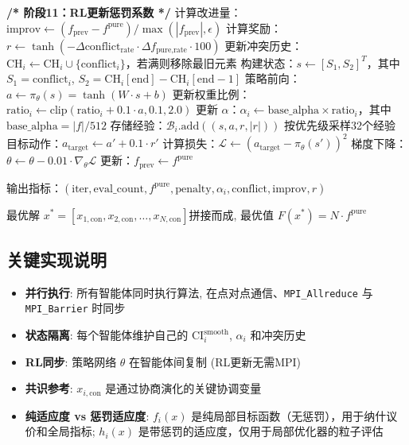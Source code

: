 \documentclass[11pt,a3paper]{ctexart}
\begin{document}
\begin{algorithmic}[1]
    \State \textbf{/* 阶段11：RL更新惩罚系数 */}
    \State 计算改进量：$\text{improv} \gets (f_{\text{prev}} - f^{\text{pure}}) / \max(|f_{\text{prev}}|, \epsilon)$ 
    \State 计算奖励：$r \gets \tanh\!\left(-\Delta\text{conflict}_{\text{rate}} \cdot \Delta f_{\text{pure,rate}} \cdot 100\right)$
    \State 更新冲突历史：$\text{CH}_i \gets \text{CH}_i \cup \{\text{conflict}_i\}$，若满则移除最旧元素
    \State 构建状态：$s \gets [S_1, S_2]^T$，其中 $S_1 = \text{conflict}_i$, $S_2 = \text{CH}_i[\text{end}] - \text{CH}_i[\text{end}-1]$
    \State 策略前向：$a \gets \pi_\theta(s) = \tanh(W \cdot s + b)$ 
    \State 更新权重比例：$\text{ratio}_i \gets \text{clip}(\text{ratio}_i + 0.1 \cdot a, 0.1, 2.0)$ 
    \State 更新 $\alpha$：$\alpha_i \gets \text{base\_alpha} \times \text{ratio}_i$，其中 $\text{base\_alpha} = |f| / 512$ 
    \State 存储经验：$\mathcal{B}_i.\text{add}((s, a, r, |r|))$ 
        \State 按优先级采样32个经验
            \State 目标动作：$a_{\text{target}} \gets a' + 0.1 \cdot r'$
            \State 计算损失：$\mathcal{L} \gets (a_{\text{target}} - \pi_\theta(s'))^2$
            \State 梯度下降：$\theta \gets \theta - 0.01 \cdot \nabla_\theta \mathcal{L}$
        \EndFor
    \EndIf
    \State 更新：$f_{\text{prev}} \gets f^{\text{pure}}$
    
        \State 输出指标：$(\text{iter}, \text{eval\_count}, f^{\text{pure}}, \text{penalty}, \alpha_i, \text{conflict}, \text{improv}, r)$
    \EndIf
\EndWhile

\State \Return 最优解 $x^* = [x_{1,\text{con}}, x_{2,\text{con}}, \ldots, x_{N,\text{con}}]$拼接而成, 最优值 $F(x^*) = N \cdot f^{\text{pure}}$
\end{algorithmic}


\subsection{关键实现说明}

\begin{itemize}
    \item \textbf{并行执行}: 所有智能体同时执行算法, 在点对点通信、\texttt{MPI\_Allreduce} 与 \texttt{MPI\_Barrier} 时同步
    \item \textbf{状态隔离}: 每个智能体维护自己的 $\text{CI}_i^{\text{smooth}}$, $\alpha_i$ 和冲突历史
    \item \textbf{RL同步}: 策略网络 $\theta$ 在智能体间复制 (RL更新无需MPI)
    \item \textbf{共识参考}: $x_{i,\text{con}}$ 是通过协商演化的关键协调变量
    \item \textbf{纯适应度 vs 惩罚适应度}: $f_i(x)$ 是纯局部目标函数（无惩罚），用于纳什议价和全局指标; $h_i(x)$ 是带惩罚的适应度，仅用于局部优化器的粒子评估
\end{itemize}
\end{document}
